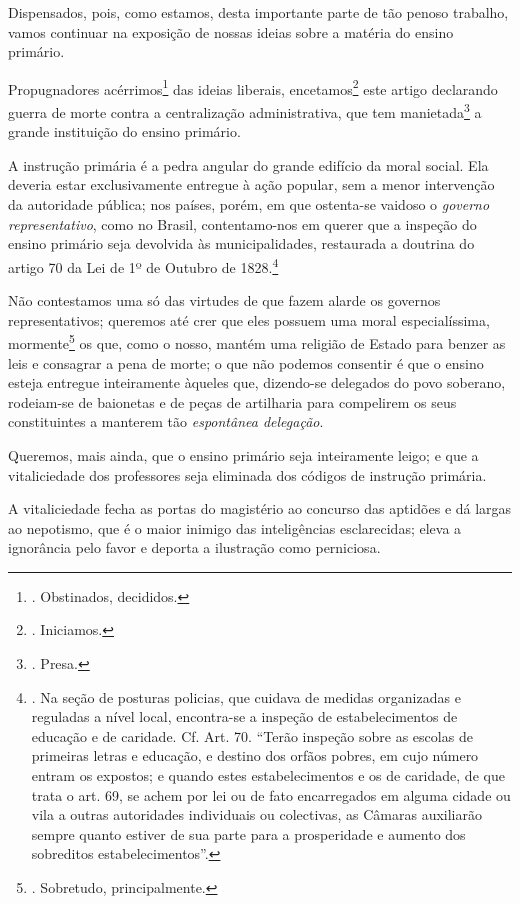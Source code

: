 Dispensados, pois, como estamos, desta importante parte de tão penoso
trabalho, vamos continuar na exposição de nossas ideias sobre a matéria
do ensino primário.

Propugnadores acérrimos\footnote{. Obstinados, decididos.} das ideias
liberais, encetamos\footnote{. Iniciamos.} este artigo declarando guerra
de morte contra a centralização administrativa, que tem
manietada\footnote{. Presa.} a grande instituição do ensino primário.

A instrução primária é a pedra angular do grande edifício da moral
social. Ela deveria estar exclusivamente entregue à ação popular, sem a
menor intervenção da autoridade pública; nos países, porém, em que
ostenta-se vaidoso o \emph{governo representativo}, como no Brasil,
contentamo-nos em querer que a inspeção do ensino primário seja
devolvida às municipalidades, restaurada a doutrina do artigo 70 da Lei
de 1º de Outubro de 1828.\footnote{. Na seção de posturas policias, que
  cuidava de medidas organizadas e reguladas a nível local, encontra-se
  a inspeção de estabelecimentos de educação e de caridade. Cf. Art. 70.
  ``Terão inspeção sobre as escolas de primeiras letras e educação, e
  destino dos orfãos pobres, em cujo número entram os expostos; e quando
  estes estabelecimentos e os de caridade, de que trata o art. 69, se
  achem por lei ou de fato encarregados em alguma cidade ou vila a
  outras autoridades individuais ou colectivas, as Câmaras auxiliarão
  sempre quanto estiver de sua parte para a prosperidade e aumento dos
  sobreditos estabelecimentos''.}

Não contestamos uma só das virtudes de que fazem alarde os governos
representativos; queremos até crer que eles possuem uma moral
especialíssima, mormente\footnote{. Sobretudo, principalmente.} os que,
como o nosso, mantém uma religião de Estado para benzer as leis e
consagrar a pena de morte; o que não podemos consentir é que o ensino
esteja entregue inteiramente àqueles que, dizendo-se delegados do povo
soberano, rodeiam-se de baionetas e de peças de artilharia para
compelirem os seus constituintes a manterem tão \emph{espontânea
delegação}.

Queremos, mais ainda, que o ensino primário seja inteiramente leigo; e
que a vitaliciedade dos professores seja eliminada dos códigos de
instrução primária.

A vitaliciedade fecha as portas do magistério ao concurso das aptidões e
dá largas ao nepotismo, que é o maior inimigo das inteligências
esclarecidas; eleva a ignorância pelo favor e deporta a ilustração como
perniciosa.

